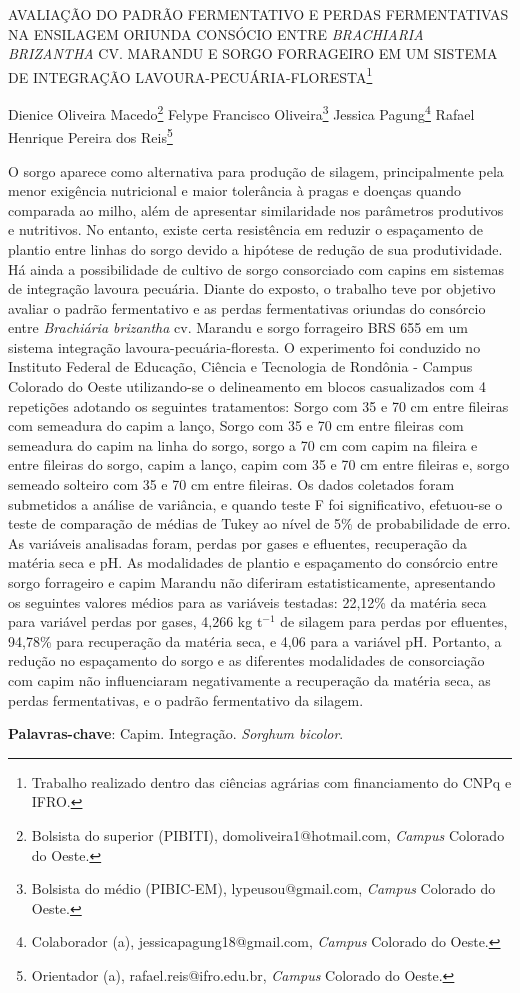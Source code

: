 \documentclass[article,12pt,onesidea,4paper,english,brazil]{abntex2}
\begin{document}
	
	
	\frenchspacing 
	
	\begin{center}
		\LARGE AVALIAÇÃO DO PADRÃO FERMENTATIVO E PERDAS FERMENTATIVAS NA ENSILAGEM ORIUNDA CONSÓCIO ENTRE \textit{BRACHIARIA BRIZANTHA} CV. MARANDU E SORGO FORRAGEIRO EM UM SISTEMA DE INTEGRAÇÃO LAVOURA-PECUÁRIA-FLORESTA\footnote{Trabalho realizado dentro das ciências agrárias com financiamento do CNPq e IFRO.}
		
		\normalsize
		Dienice Oliveira Macedo\footnote{Bolsista do superior (PIBITI), domoliveira1@hotmail.com, \textit{Campus} Colorado do Oeste.} 
		Felype Francisco Oliveira\footnote{Bolsista do médio (PIBIC-EM), lypeusou@gmail.com, \textit{Campus} Colorado do Oeste.} 
		Jessica Pagung\footnote{Colaborador (a), jessicapagung18@gmail.com, \textit{Campus} Colorado do Oeste.} 
		Rafael Henrique Pereira dos Reis\footnote{Orientador (a), rafael.reis@ifro.edu.br, \textit{Campus} Colorado do Oeste.} 
	\end{center}
	
	\noindent O sorgo aparece como alternativa para produção de silagem, principalmente pela
	menor exigência nutricional e maior tolerância à pragas e doenças quando
	comparada ao milho, além de apresentar similaridade nos parâmetros produtivos e
	nutritivos. No entanto, existe certa resistência em reduzir o espaçamento de plantio
	entre linhas do sorgo devido a hipótese de redução de sua produtividade. Há ainda a
	possibilidade de cultivo de sorgo consorciado com capins em sistemas de integração
	lavoura pecuária. Diante do exposto, o trabalho teve por objetivo avaliar o padrão
	fermentativo e as perdas fermentativas oriundas do consórcio entre \textit{Brachiária
	brizantha} cv. Marandu e sorgo forrageiro BRS 655 em um sistema integração
	lavoura-pecuária-floresta. O experimento foi conduzido no Instituto Federal de
	Educação, Ciência e Tecnologia de Rondônia - Campus Colorado do Oeste
	utilizando-se o delineamento em blocos casualizados com 4 repetições adotando os
	seguintes tratamentos: Sorgo com 35 e 70 cm entre fileiras com semeadura do
	capim a lanço, Sorgo com 35 e 70 cm entre fileiras com semeadura do capim na
	linha do sorgo, sorgo a 70 cm com capim na fileira e entre fileiras do sorgo, capim a
	lanço, capim com 35 e 70 cm entre fileiras e, sorgo semeado solteiro com 35 e 70
	cm entre fileiras. Os dados coletados foram submetidos a análise de variância, e
	quando teste F foi significativo, efetuou-se o teste de comparação de médias de
	Tukey ao nível de 5\% de probabilidade de erro. As variáveis analisadas foram,
	perdas por gases e efluentes, recuperação da matéria seca e pH. As modalidades
	de plantio e espaçamento do consórcio entre sorgo forrageiro e capim Marandu não
	diferiram estatisticamente, apresentando os seguintes valores médios para as
	variáveis testadas: 22,12\% da matéria seca para variável perdas por gases, 4,266 kg
	t$^{-1}$ de silagem para perdas por efluentes, 94,78\% para recuperação da matéria seca,
	e 4,06 para a variável pH. Portanto, a redução no espaçamento do sorgo e as
	diferentes modalidades de consorciação com capim não influenciaram
	negativamente a recuperação da matéria seca, as perdas fermentativas, e o padrão
	fermentativo da silagem.
	
	\vspace{\onelineskip}
	
	\noindent
	\textbf{Palavras-chave}: Capim. Integração. \textit{Sorghum bicolor}.
	
\end{document}
